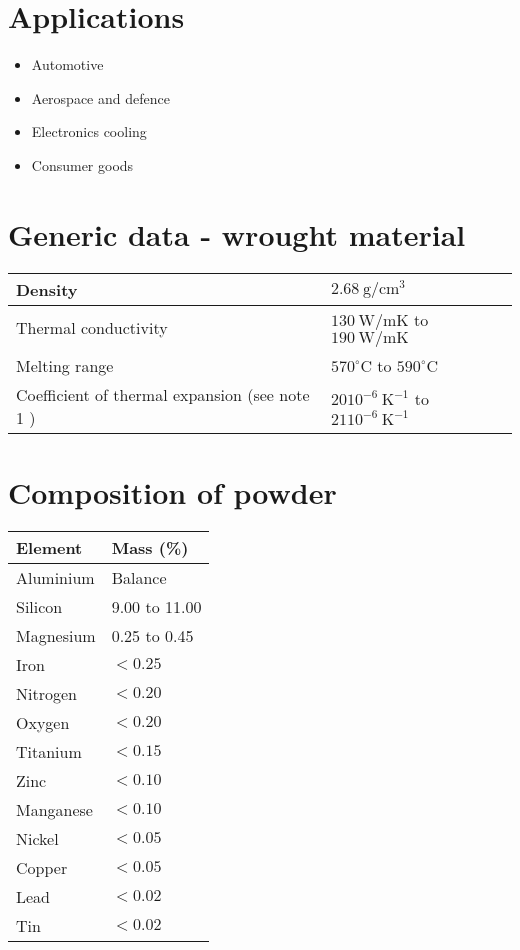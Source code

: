 \documentclass[10pt]{article}
\begin{document}
\section*{Applications}
\begin{itemize}
  \item Automotive

  \item Aerospace and defence

  \item Electronics cooling

  \item Consumer goods

\end{itemize}

\section*{Generic data - wrought material}
\begin{center}
\begin{tabular}{|l|l|}
\hline
Density & $2.68 \mathrm{~g} / \mathrm{cm}^{3}$ \\
\hline
Thermal conductivity & $130 \mathrm{~W} / \mathrm{mK}$ to $190 \mathrm{~W} / \mathrm{mK}$ \\
\hline
Melting range & $570^{\circ} \mathrm{C}$ to $590^{\circ} \mathrm{C}$ \\
\hline
Coefficient of thermal expansion (see note 1 ) & $2010^{-6} \mathrm{~K}^{-1}$ to $2110^{-6} \mathrm{~K}^{-1}$ \\
\hline
\end{tabular}
\end{center}

\section*{Composition of powder}
\begin{center}
\begin{tabular}{|l|l|}
\hline
Element & Mass (\%) \\
\hline
Aluminium & Balance \\
\hline
Silicon & 9.00 to 11.00 \\
\hline
Magnesium & 0.25 to 0.45 \\
\hline
Iron & $<0.25$ \\
\hline
Nitrogen & $<0.20$ \\
\hline
Oxygen & $<0.20$ \\
\hline
Titanium & $<0.15$ \\
\hline
Zinc & $<0.10$ \\
\hline
Manganese & $<0.10$ \\
\hline
Nickel & $<0.05$ \\
\hline
Copper & $<0.05$ \\
\hline
Lead & $<0.02$ \\
\hline
Tin & $<0.02$ \\
\hline
\end{tabular}
\end{center}
\end{document}
